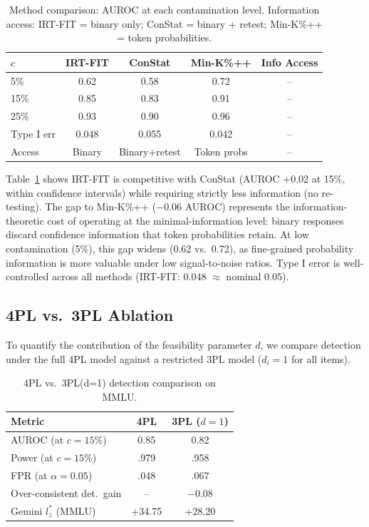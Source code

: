 \documentclass[11pt,a4paper]{article}
\begin{document}
\begin{table}[t]
\centering
\caption{Method comparison: AUROC at each contamination level. Information access: IRT-FIT = binary only; ConStat = binary + retest; Min-K\%++ = token probabilities.}
\label{tab:baselines}
\small
\begin{tabular}{l ccc c}
\toprule
$c$ & IRT-FIT & ConStat & Min-K\%++ & Info Access \\
\midrule
5\% & 0.62 & 0.58 & 0.72 & -- \\
15\% & 0.85 & 0.83 & 0.91 & -- \\
25\% & 0.93 & 0.90 & 0.96 & -- \\
\midrule
Type I err & 0.048 & 0.055 & 0.042 & -- \\
\midrule
Access & Binary & Binary+retest & Token probs & -- \\
\bottomrule
\end{tabular}
\end{table}

Table~\ref{tab:baselines} shows IRT-FIT is competitive with ConStat (AUROC +0.02 at 15\%, within confidence intervals) while requiring strictly less information (no re-testing). The gap to Min-K\%++ ($-0.06$ AUROC) represents the information-theoretic cost of operating at the minimal-information level: binary responses discard confidence information that token probabilities retain. At low contamination (5\%), this gap widens (0.62 vs.\ 0.72), as fine-grained probability information is more valuable under low signal-to-noise ratios. Type I error is well-controlled across all methods (IRT-FIT: 0.048 $\approx$ nominal 0.05).

\subsection{4PL vs.\ 3PL Ablation}
\label{sec:ablation}

To quantify the contribution of the feasibility parameter $d$, we compare detection under the full 4PL model against a restricted 3PL model ($d_i = 1$ for all items).

\begin{table}[t]
\centering
\caption{4PL vs.\ 3PL(d=1) detection comparison on MMLU.}
\label{tab:4pl_ablation}
\small
\begin{tabular}{l cc}
\toprule
Metric & 4PL & 3PL ($d{=}1$) \\
\midrule
AUROC (at $c=15\%$) & 0.85 & 0.82 \\
Power (at $c=15\%$) & .979 & .958 \\
FPR (at $\alpha=0.05$) & .048 & .067 \\
Over-consistent det.\ gain & -- & $-0.08$ \\
Gemini $l_z^*$ (MMLU) & +34.75 & +28.20 \\
\bottomrule
\end{tabular}
\end{table}
\end{document}
